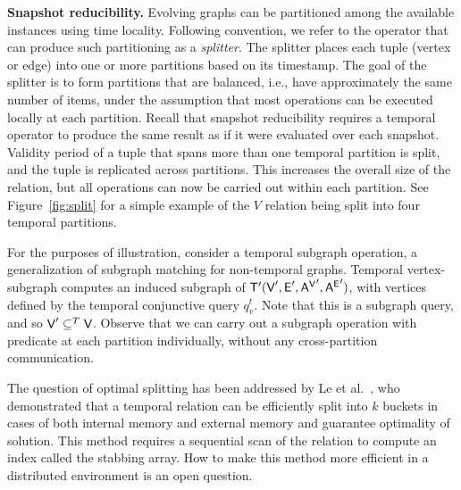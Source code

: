 {\bf Snapshot reducibility.}  Evolving graphs can be partitioned among
the available instances using time locality.  Following convention, we
refer to the operator that can produce such partitioning as a {\em
  splitter}.  The splitter places each tuple (vertex or edge) into one
or more partitions based on its timestamp.  The goal of the splitter
is to form partitions that are balanced, i.e., have approximately the
same number of items, under the assumption that most operations can be
executed locally at each partition.  Recall that snapshot reducibility
requires a temporal operator to produce the same result as if it were
evaluated over each snapshot.  Validity period of a tuple that spans
more than one temporal partition is split, and the tuple is replicated
across partitions.  This increases the overall size of the relation,
but all operations can now be carried out within each partition.  See
Figure~\ref{fig:split} for a simple example of the $V$ relation being
split into four temporal partitions.  

For the purposes of illustration, consider a temporal subgraph
operation, a generalization of subgraph matching for non-temporal
graphs.  Temporal vertex-subgraph  computes an
induced subgraph of \tve $\mathsf{T}'(\textsf{V}', \textsf{E}', \mathsf{A^{V}}', \mathsf{A^{E}}')$, with
vertices defined by the temporal conjunctive query $q^t_v$.  Note that
this is a subgraph query, and so $\textsf{V}' \subseteq^T \textsf{V}$.  Observe that
we can carry out a subgraph operation with predicate
 at each partition individually, without any
cross-partition communication.

The question of optimal splitting has been addressed by Le et
al.~\cite{Le2013}, who demonstrated that a temporal relation can be
efficiently split into $k$ buckets in cases of both internal memory
and external memory and guarantee optimality of solution.  This method requires a sequential scan of the relation to
compute an index called the stabbing array.  How to make this method
more efficient in a distributed environment is an open question.



